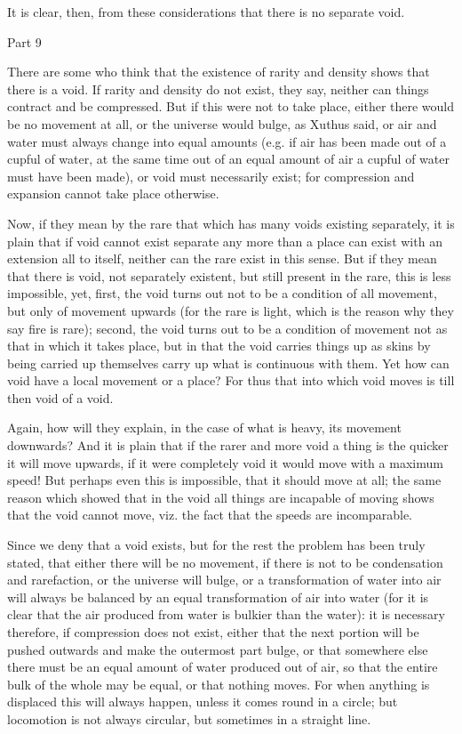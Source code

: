 It is clear, then, from these considerations that there is no separate
void. 

Part 9

There are some who think that the existence of rarity and density
shows that there is a void. If rarity and density do not exist, they
say, neither can things contract and be compressed. But if this were
not to take place, either there would be no movement at all, or the
universe would bulge, as Xuthus said, or air and water must always
change into equal amounts (e.g. if air has been made out of a cupful
of water, at the same time out of an equal amount of air a cupful
of water must have been made), or void must necessarily exist; for
compression and expansion cannot take place otherwise. 

Now, if they mean by the rare that which has many voids existing separately,
it is plain that if void cannot exist separate any more than a place
can exist with an extension all to itself, neither can the rare exist
in this sense. But if they mean that there is void, not separately
existent, but still present in the rare, this is less impossible,
yet, first, the void turns out not to be a condition of all movement,
but only of movement upwards (for the rare is light, which is the
reason why they say fire is rare); second, the void turns out to be
a condition of movement not as that in which it takes place, but in
that the void carries things up as skins by being carried up themselves
carry up what is continuous with them. Yet how can void have a local
movement or a place? For thus that into which void moves is till then
void of a void. 

Again, how will they explain, in the case of what is heavy, its movement
downwards? And it is plain that if the rarer and more void a thing
is the quicker it will move upwards, if it were completely void it
would move with a maximum speed! But perhaps even this is impossible,
that it should move at all; the same reason which showed that in the
void all things are incapable of moving shows that the void cannot
move, viz. the fact that the speeds are incomparable. 

Since we deny that a void exists, but for the rest the problem has
been truly stated, that either there will be no movement, if there
is not to be condensation and rarefaction, or the universe will bulge,
or a transformation of water into air will always be balanced by an
equal transformation of air into water (for it is clear that the air
produced from water is bulkier than the water): it is necessary therefore,
if compression does not exist, either that the next portion will be
pushed outwards and make the outermost part bulge, or that somewhere
else there must be an equal amount of water produced out of air, so
that the entire bulk of the whole may be equal, or that nothing moves.
For when anything is displaced this will always happen, unless it
comes round in a circle; but locomotion is not always circular, but
sometimes in a straight line. 

